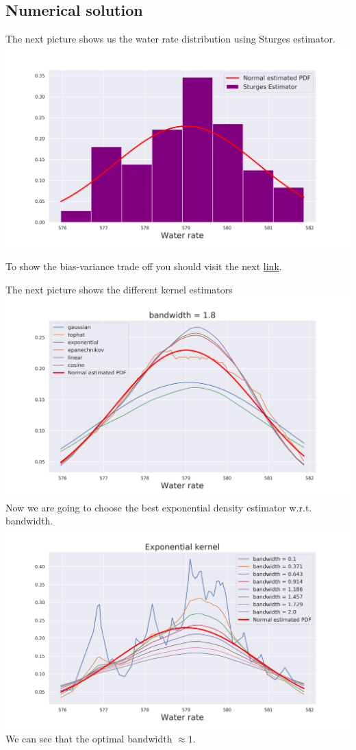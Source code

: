 \documentclass[a4paper, 12pt]{article}
\begin{document}
\subsection{Numerical solution}
The next picture shows us the water rate distribution using Sturges estimator.
\includegraphics[width=\textwidth]{Images/Task1_1.png}

To show the bias-variance trade off you should  visit the next \href{https://github.com/vitomania/ozon/blob/master/stats/hw2/Images\\
/Task1_2.gif}{link}.

The next picture shows the different kernel estimators\\
\includegraphics[width=\textwidth]{Images/Task1_3.png}
Now we are going to choose the best exponential density estimator w.r.t. bandwidth. \\
\includegraphics[width=\textwidth]{Images/Task1_4.png}
We can see that the optimal bandwidth $\approx 1.$
\end{document}
